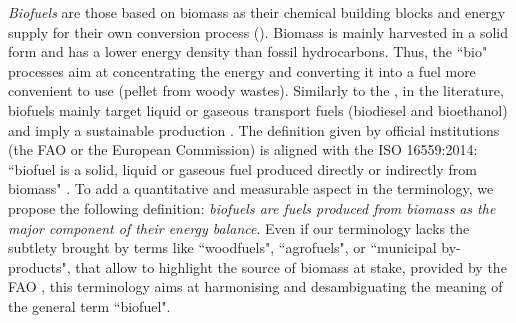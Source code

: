 
\textit{Biofuels} are those based on biomass as their chemical building blocks and energy supply for their own conversion process (). Biomass is mainly harvested in a solid form and has a lower energy density than fossil hydrocarbons. Thus, the ``bio" processes aim at concentrating the energy and converting it into a fuel more convenient to use (\eg pellet from woody wastes). %
Similarly to the \citet{OEERE_biofuel}, in the literature, biofuels mainly target liquid or gaseous transport fuels (\eg biodiesel and bioethanol) and imply a sustainable production \cite{eu_biofuel, pottering2009directive}. The definition given by official institutions (\eg the FAO or the European Commission) is aligned with the ISO 16559:2014: ``biofuel is a solid, liquid or gaseous fuel produced directly or indirectly from biomass" \cite{eu_biofuels, FAO_biofuel, ISO16559}. To add a quantitative and measurable aspect in the terminology, we propose the following definition: \textit{biofuels are fuels produced from biomass as the major component of their energy balance}. Even if our terminology lacks the subtlety brought by terms like ``woodfuels", ``agrofuels", or ``municipal by-products", that allow to highlight the source of biomass at stake, provided by the FAO \cite{FAO_biofuel}, this terminology aims at harmonising and desambiguating the meaning of the general term ``biofuel".


 
